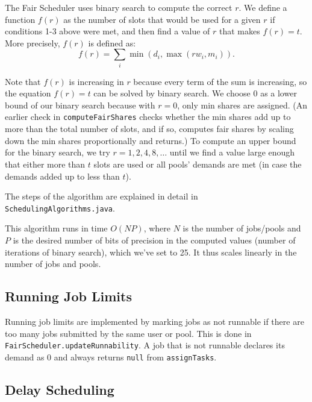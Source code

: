 \documentclass[11pt]{article}
\begin{document}
The Fair Scheduler uses binary search to compute the correct $r$. We define a function $f(r)$ as the number of slots that would be used for a given $r$ if conditions 1-3 above were met, and then find a value of $r$ that makes $f(r)=t$. More precisely, $f(r)$ is defined as:
$$f(r) = \sum_i{\min(d_i, \max(r w_i, m_i)).}$$

Note that $f(r)$ is increasing in $r$ because every term of the sum is increasing, so the equation $f(r) = t$ can be solved by binary search. We choose 0 as a lower bound of our binary search because with $r=0$, only min shares are assigned. (An earlier check in {\tt computeFairShares} checks whether the min shares add up to more than the total number of slots, and if so, computes fair shares by scaling down the min shares proportionally and returns.) To compute an upper bound for the binary search, we try $r=1,2,4,8,\dots$ until we find a value large enough that either more than $t$ slots are used or all pools' demands are met (in case the demands added up to less than $t$).

The steps of the algorithm are explained in detail in {\tt SchedulingAlgorithms.java}.

This algorithm runs in time $O(NP)$, where $N$ is the number of jobs/pools and $P$ is the desired number of bits of precision in the computed values (number of iterations of binary search), which we've set to 25. It thus scales linearly in the number of jobs and pools.

\subsection{Running Job Limits}

Running job limits are implemented by marking jobs as not runnable if there are too many jobs submitted by the same user or pool. This is done in {\tt FairScheduler.updateRunnability}. A job that is not runnable declares its demand as 0 and always returns {\tt null} from {\tt assignTasks}.

\subsection{Delay Scheduling}
\label{sec:delay-scheduling}
\end{document}

